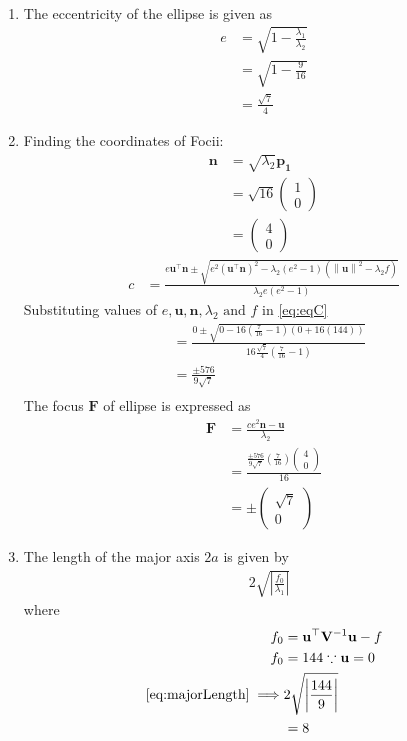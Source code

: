 \documentclass[12pt]{article}
\providecommand{\brak}[1]{\ensuremath{\left(#1\right)}}
\providecommand{\norm}[1]{\left\lVert#1\right\rVert}
\providecommand{\abs}[1]{\left\vert#1\right\vert}
\newcommand{\myvec}[1]{\ensuremath{\begin{pmatrix}#1\end{pmatrix}}}
\let\vec\mathbf
\begin{document}
\begin{enumerate}
\begin{align}
\end{align}
\begin{enumerate}
\item The eccentricity of the ellipse is given as  
\begin{align}
	e &= \sqrt{1-\frac{\lambda_1}{\lambda_2}} \\
	  &= \sqrt{1-\frac{9}{16}} \\
          &= \frac{\sqrt{7}}{4}
\end{align}
\item Finding the coordinates of Focii: 
\begin{align}
	\vec{n} &= \sqrt{\lambda_2}\vec{p_1} \\
	&= \sqrt{16}\myvec{1 \\ 0} \\
	\label{eq:eqN}
	&= \myvec{4 \\ 0} 
\end{align}
\begin{align}
	\label{eq:eqC}
	c  &=    \frac{e\vec{u}^{\top}\vec{n} \pm \sqrt{e^2\brak{\vec{u}^{\top}\vec{n}}^2-\lambda_2\brak{e^2-1}\brak{\norm{\vec{u}}^2 - \lambda_2 f}}}{\lambda_2e\brak{e^2-1}} 
\end{align}
Substituting values of $e, \vec{u}, \vec{n}, \lambda_2 \text{ and } f$ in \eqref{eq:eqC}
\begin{align}
	&=    \frac{0 \pm \sqrt{0-16\brak{\frac{7}{16}-1}\brak{{0 + 16\brak{144}}}}}{16\frac{\sqrt{7}}{4}\brak{\frac{7}{16}-1}} \\ 
	&=    \frac{ \pm 576}{9\sqrt{7}}  \\  
\end{align}
The focus $\vec{F}$ of ellipse is expressed as
\begin{align}
	\vec{F} &= \frac{ce^2\vec{n}-\vec{u}}{\lambda_2} \\
	&= \frac{\frac{ \pm 576}{9\sqrt{7}} \brak{\frac{7}{16}}\myvec{4 \\0}}{16} \\
	&= \pm \myvec{\sqrt{7} \\ 0}
\end{align}
\item  The length of the major axis $2a$ is given by
\begin{align}
	\label{eq:majorLength}
	& 2\sqrt{\abs{\frac{f_0}{\lambda_1}}}
\end{align}
where
\begin{align}
	 f_0 &= \vec{u}^\top\vec{V}^{-1}\vec{u}-f \\
	 f_0 &= 144 \because \vec{u} = 0 \\
	\eqref{eq:majorLength} \implies  & 2\sqrt{\abs{\frac{144}{9}}}\\
	&= 8
\end{align}


\end{enumerate}
\end{enumerate}
\end{document}

